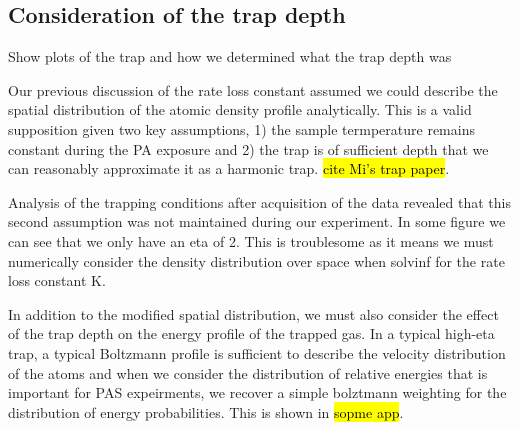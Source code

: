 %

\subsection{Consideration of the trap depth}
\label{sec:trunc_trap}

Show plots of the trap and how we determined what the trap depth was

Our previous discussion of the rate loss constant assumed we could describe the spatial distribution of the atomic density profile analytically. This is a valid supposition given two key assumptions, 1) the sample termperature remains constant during the PA exposure and 2) the trap is of sufficient depth that we can reasonably approximate it as a harmonic trap. \hl{cite Mi's trap paper}.

Analysis of the trapping conditions after acquisition of the data revealed that this second assumption was not maintained during our experiment. In some figure we can see that we only have an eta of 2. This is troublesome as it means we must numerically consider the density distribution over space when solvinf for the rate loss constant K. 

In addition to the modified spatial distribution, we must also consider the effect of the trap depth on the energy profile of the trapped gas. In a typical high-eta trap, a typical Boltzmann profile is sufficient to describe the velocity distribution of the atoms and when we consider the distribution of relative energies that is important for PAS expeirments, we recover a simple bolztmann weighting for the distribution of energy probabilities. This is shown in \hl{sopme app}.

